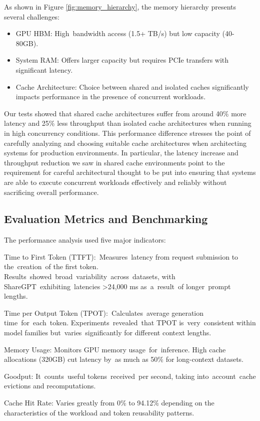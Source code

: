 \documentclass[sigconf,nonacm]{acmart}
\begin{document}
As shown in Figure \ref{fig:memory_hierarchy}, the memory hierarchy presents several challenges:
\begin{itemize}[leftmargin=*, topsep=1ex, partopsep=0pt, itemsep=0pt, parsep=0pt]
\item GPU HBM: High bandwidth access (1.5+ TB/s) but low capacity (40-80GB).
\item System RAM: Offers larger capacity but requires PCIe transfers with significant latency.
\item Cache Architecture: Choice between shared and isolated caches significantly impacts performance in the presence of concurrent workloads.
\end{itemize}
Our tests showed that shared cache architectures suffer from around 40\% more latency and 25\% less throughput than isolated cache architectures when running in high concurrency conditions. This performance difference stresses the point of carefully analyzing and choosing suitable cache architectures when architecting systems for production environments. In particular, the latency increase and throughput reduction we saw in shared cache environments point to the requirement for careful architectural thought to be put into ensuring that systems are able to execute concurrent workloads effectively and reliably without sacrificing overall performance.
\subsection{Evaluation Metrics and Benchmarking}
\label{sec:subsection}
The performance analysis used five major indicators:
\par Time to First Token (TTFT): Measures latency from request submission to the creation of the first token. Results showed broad variability across datasets, with ShareGPT exhibiting latencies >24,000 ms as a result of longer prompt lengths.
\par Time per Output Token (TPOT): Calculates average generation time for each token. Experiments revealed that TPOT is very consistent within model families but varies significantly for different context lengths.
\par Memory Usage: Monitors GPU memory usage for inference. High cache allocations (320GB) cut latency by as much as 50\% for long-context datasets.
\par Goodput: It counts useful tokens received per second, taking into account cache evictions and recomputations.
\par Cache Hit Rate: Varies greatly from 0\% to 94.12\% depending on the characteristics of the workload and token reusability patterns.
\end{document}
